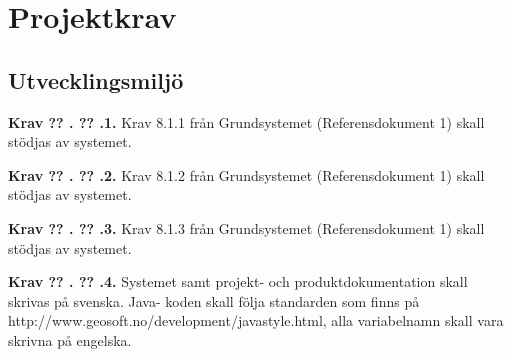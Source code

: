 \documentclass[a4paper]{article}
\newcommand\getcurrentref[1]{%
 \ifnumequal{\value{#1}}{0}
  {??}
  {\the\value{#1}}%
}
\newcommand\requirement[2]{
	\numberedrow{Krav}{#1}{#2}
}
\newcommand\numberedrow[3]{
	\noindent
	\textbf{#1 \getcurrentref{section}.\getcurrentref{subsection}.#2.} #3
	
}
\begin{document}
\section{Projektkrav}
	\subsection{Utvecklingsmiljö}
	\requirement{1}{Krav 8.1.1 från Grundsystemet (Referensdokument 1) skall stödjas av systemet.}
	\requirement{2}{Krav 8.1.2 från Grundsystemet (Referensdokument 1) skall stödjas av systemet.}
	\requirement{3}{Krav 8.1.3 från Grundsystemet (Referensdokument 1) skall stödjas av systemet.}
	\requirement{4}{Systemet samt projekt- och produktdokumentation skall skrivas på svenska. Java- koden skall följa standarden som finns på http://www.geosoft.no/development/javastyle.html, alla variabelnamn skall vara skrivna på engelska.}
\end{document}
